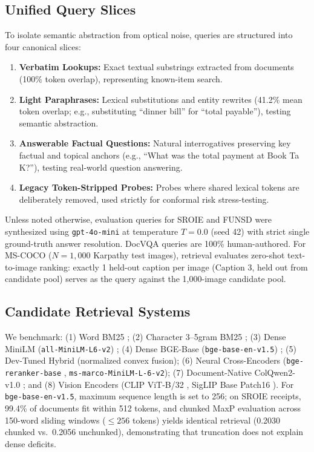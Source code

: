 \subsection{Unified Query Slices}
To isolate semantic abstraction from optical noise, queries are structured into four canonical slices:
\begin{enumerate}
    \setlength{\itemsep}{0.2pt plus 0.1pt}
    \setlength{\parskip}{0pt}
    \item \textbf{Verbatim Lookups:} Exact textual substrings extracted from documents (100\% token overlap), representing known-item search.
    \item \textbf{Light Paraphrases:} Lexical substitutions and entity rewrites (41.2\% mean token overlap; e.g., substituting ``dinner bill'' for ``total payable''), testing semantic abstraction.
    \item \textbf{Answerable Factual Questions:} Natural interrogatives preserving key factual and topical anchors (e.g., ``What was the total payment at Book Ta K?''), testing real-world question answering.
    \item \textbf{Legacy Token-Stripped Probes:} Probes where shared lexical tokens are deliberately removed, used strictly for conformal risk stress-testing.
\end{enumerate}
Unless noted otherwise, evaluation queries for SROIE and FUNSD were synthesized using \texttt{gpt-4o-mini} \cite{openai2024gpt4o} at temperature $T=0.0$ (seed 42) with strict single ground-truth answer resolution. DocVQA queries are 100\% human-authored. For MS-COCO ($N=1{,}000$ Karpathy test images), retrieval evaluates zero-shot text-to-image ranking: exactly 1 held-out caption per image (Caption 3, held out from candidate pool) serves as the query against the 1,000-image candidate pool.

\subsection{Candidate Retrieval Systems}
We benchmark: (1) Word BM25 \cite{robertson2009bm25}; (2) Character 3--5gram BM25 \cite{mcnamee2004character}; (3) Dense MiniLM (\texttt{all-MiniLM-L6-v2}) \cite{reimers2019sbert}; (4) Dense BGE-Base (\texttt{bge-base-en-v1.5}) \cite{xiao2023bge}; (5) Dev-Tuned Hybrid (normalized convex fusion); (6) Neural Cross-Encoders (\texttt{bge-reranker-base} \cite{xiao2023bge}, \texttt{ms-marco-MiniLM-L-6-v2}); (7) Document-Native ColQwen2-v1.0 \cite{faysse2024colqwen2}; and (8) Vision Encoders (CLIP ViT-B/32 \cite{radford2021clip}, SigLIP Base Patch16 \cite{zhai2023siglip}). For \texttt{bge-base-en-v1.5}, maximum sequence length is set to 256; on SROIE receipts, 99.4\% of documents fit within 512 tokens, and chunked MaxP evaluation across 150-word sliding windows ($\le 256$ tokens) yields identical retrieval (0.2030 chunked vs.\ 0.2056 unchunked), demonstrating that truncation does not explain dense deficits.

